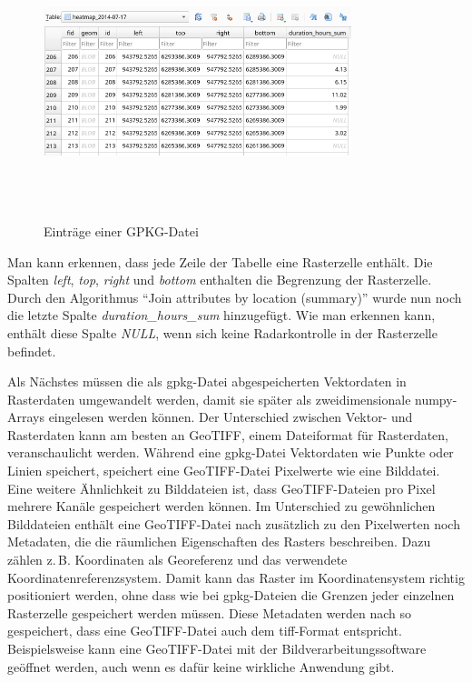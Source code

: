 \begin{figure}[h]
    \centering
    \includegraphics[width=0.8\textwidth,height=8cm,keepaspectratio=true]{content/images/GpkgExample.png}
    \caption{Einträge einer GPKG-Datei}
    \label{fig:GpkgExample}
\end{figure}

Man kann erkennen, dass jede Zeile der Tabelle eine Rasterzelle enthält.
Die Spalten \emph{left}, \emph{top}, \emph{right} und \emph{bottom} enthalten die Begrenzung der Rasterzelle.
Durch den Algorithmus "`Join attributes by location (summary)"' wurde nun noch die letzte Spalte \emph{duration\_hours\_sum} hinzugefügt.
Wie man erkennen kann, enthält diese Spalte \emph{NULL}, wenn sich keine Radarkontrolle in der Rasterzelle befindet.

Als Nächstes müssen die als \acrshort{gpkg}-Datei abgespeicherten Vektordaten in Rasterdaten umgewandelt werden, damit sie später als zweidimensionale numpy-Arrays eingelesen werden können.
Der Unterschied zwischen Vektor- und Rasterdaten kann am besten an GeoTIFF, einem Dateiformat für Rasterdaten, veranschaulicht werden.
Während eine \acrshort{gpkg}-Datei Vektordaten wie Punkte oder Linien speichert, speichert eine GeoTIFF-Datei Pixelwerte wie eine Bilddatei.
Eine weitere Ähnlichkeit zu Bilddateien ist, dass GeoTIFF-Dateien pro Pixel mehrere Kanäle gespeichert werden können.
Im Unterschied zu gewöhnlichen Bilddateien enthält eine GeoTIFF-Datei nach \cite[S. 128]{PracticalGIS} zusätzlich zu den Pixelwerten noch Metadaten, die die räumlichen Eigenschaften des Rasters beschreiben.
Dazu zählen z.\,B. Koordinaten als Georeferenz und das verwendete Koordinatenreferenzsystem.
Damit kann das Raster im Koordinatensystem richtig positioniert werden, ohne dass wie bei \acrshort{gpkg}-Dateien die Grenzen jeder einzelnen Rasterzelle gespeichert werden müssen.
Diese Metadaten werden nach \cite{GeoTIFFStandard} so gespeichert, dass eine GeoTIFF-Datei auch dem \acrshort{tiff}-Format entspricht.
Beispielsweise kann eine GeoTIFF-Datei mit der Bildverarbeitungssoftware  geöffnet werden, auch wenn es dafür keine wirkliche Anwendung gibt.

